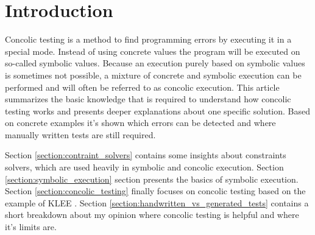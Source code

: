 \section{Introduction}
Concolic testing is a method to find programming errors by executing it in a special mode.
Instead of using concrete values the program will be executed on so-called symbolic values.
Because an execution purely based on symbolic values is sometimes not possible, a mixture of concrete and symbolic execution can be performed and will often be referred to as concolic execution.
This article summarizes the basic knowledge that is required to understand how concolic testing works and presents deeper explanations about one specific solution.
Based on concrete examples it's shown which errors can be detected and where manually written tests are still required.


Section \ref{section:contraint_solvers} contains some insights about constraints solvers, which are used heavily in symbolic and concolic execution.
Section \ref{section:symbolic_execution} section presents the basics of symbolic execution.
Section \ref{section:concolic_testing} finally focuses on concolic testing based on the example of KLEE \cite{Cadar:2008:KUA:1855741.1855756}. 
Section \ref{section:handwritten_vs_generated_tests} contains a short breakdown about my opinion where concolic testing is helpful and where it's limits are.
